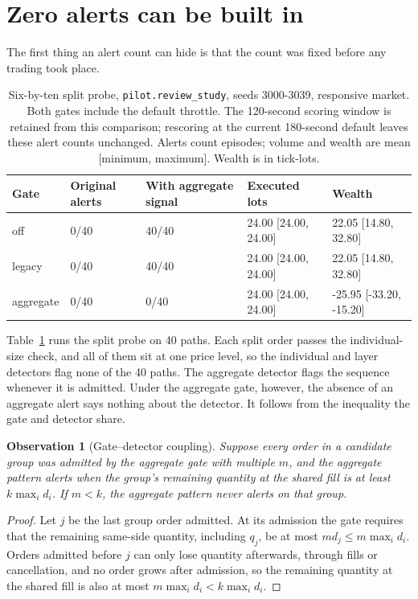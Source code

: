\documentclass{article}
\newtheorem{proposition}{Observation}
\begin{document}
\section{Zero alerts can be built in}\label{sec:aggregation}

The first thing an alert count can hide is that the count was fixed before any trading took place.

\begin{table}[htbp]
\centering
\small
\begin{tabular}{lllll}
\toprule
\textbf{Gate} & \textbf{Original alerts} & \textbf{With aggregate signal} & \textbf{Executed lots} & \textbf{Wealth} \\
\midrule
off & 0/40 & 40/40 & 24.00 [24.00, 24.00] & 22.05 [14.80, 32.80] \\
legacy & 0/40 & 40/40 & 24.00 [24.00, 24.00] & 22.05 [14.80, 32.80] \\
aggregate & 0/40 & 0/40 & 24.00 [24.00, 24.00] & -25.95 [-33.20, -15.20] \\
\bottomrule
\end{tabular}
\caption{Six-by-ten split probe, \texttt{pilot.review\_study}, seeds 3000-3039, responsive market. Both gates include the default throttle. The 120-second scoring window is retained from this comparison; rescoring at the current 180-second default leaves these alert counts unchanged. Alerts count episodes; volume and wealth are mean [minimum, maximum]. Wealth is in tick-lots.}
\label{tab:split}
\end{table}

Table~\ref{tab:split} runs the split probe on 40 paths. Each split order passes the individual-size check, and all of them sit at one price level, so the individual and layer detectors flag none of the 40 paths. The aggregate detector flags the sequence whenever it is admitted. Under the aggregate gate, however, the absence of an aggregate alert says nothing about the detector. It follows from the inequality the gate and detector share.

\begin{proposition}[Gate--detector coupling]\label{prop:coupling}
Suppose every order in a candidate group was admitted by the aggregate gate with multiple $m$, and the aggregate pattern alerts when the group's remaining quantity at the shared fill is at least $k \max_i d_i$. If $m < k$, the aggregate pattern never alerts on that group.
\end{proposition}

\begin{proof}
Let $j$ be the last group order admitted. At its admission the gate requires that the remaining same-side quantity, including $q_j$, be at most $m d_j \le m \max_i d_i$. Orders admitted before $j$ can only lose quantity afterwards, through fills or cancellation, and no order grows after admission, so the remaining quantity at the shared fill is also at most $m \max_i d_i < k \max_i d_i$.
\end{proof}
\end{document}
